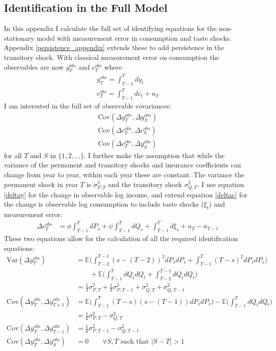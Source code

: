 \subsection{Identification in the Full Model} \label{identification}
In this appendix I calculate the full set of identifying equations for the non-stationary model with measurement error in consumption and taste shocks. Appendix \ref{persistence_appendix} extends these to add persistence in the transitory shock. With classical measurement error on consumption the observables are now $y^{obs}_T$ and $c^{obs}_T$ where
\begin{align*}
y^{obs}_T = \int_{T-1}^{T} dy_t \\
c^{obs}_T = \int_{T-1}^{T} dc_t + u_T
\end{align*}
I am interested in the full set of observable covariances:
\begin{align*}
\mathrm{Cov}(\Delta y^{obs}_T, \Delta y^{obs}_S) \\
\mathrm{Cov}(\Delta c^{obs}_T, \Delta c^{obs}_S) \\
\mathrm{Cov}(\Delta c^{obs}_T,  \Delta y^{obs}_S)
\end{align*}
for all $T$ and $S$ in $\{1,2,...\}$. I further make the assumption that while the variance of the permanent and transitory shocks and insurance coefficients can change from year to year, within each year these are constant. The variance the permanent shock in year $T$ is $\sigma^2_{P,T}$ and the transitory shock $\sigma^2_{Q,T}$. I use equation \ref{deltay} for the change in observable log income, and extend equation \ref{deltac} for the change is observable log consumption to include taste shocks ($\xi_t$) and measurement error:
\begin{align}
\Delta c^{obs}_T &= \phi  \int_{T-1}^{T} dP_s  +\psi \int_{T-1}^{T}dQ_s +\int_{T-1}^{T}d\xi_s  + u_T - u_{T-1} \nonumber
\end{align}
These two equations allow for the calculation of all the required identification equations:
\begin{align}
\mathrm{Var}(\Delta y^{obs}_T) &= \mathbb{E} \Big(\int_{T-2}^{T-1} (s-(T-2))^2 dP_s dP_s  + \int_{T-1}^{T} (T-s)^2 dP_s dP_s \Big) \nonumber \\
& \qquad + \mathbb{E} \Big(\int_{T-1}^{T} dQ_t dQ_t +\int_{T-2}^{T-1} dQ_t dQ_t \Big) \nonumber \\
&= \frac{1}{3} \sigma^2_{P,T} + \frac{1}{3} \sigma^2_{P,T-1} +  \sigma^2_{Q,T} +  \sigma^2_{Q,T-1} \label{inc_var_indentification}\\
\mathrm{Cov}(\Delta y^{obs}_T, \Delta y^{obs}_{T+1}) &=  \mathbb{E} \Big(\int_{T-1}^{T} (T-s)(s-(T-1)) dP_s dP_s  \Big) - \mathbb{E} \Big(\int_{T-1}^{T} dQ_t dQ_t \Big) \nonumber \\
&= \frac{1}{6}\sigma^2_{P,T} - \sigma^2_{Q,T} \\
\mathrm{Cov}(\Delta y^{obs}_T, \Delta y^{obs}_{T-1}) &= \frac{1}{6}\sigma^2_{P,T-1} - \sigma^2_{Q,T-1} \\
\mathrm{Cov}(\Delta y^{obs}_T, \Delta y^{obs}_{S}) &= 0 \qquad \forall S,T \text{ such that }|S-T| >1 
\end{align}
